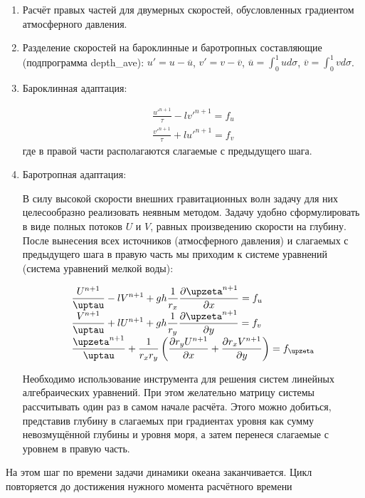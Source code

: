 \begin{enumerate}
\item Расчёт правых частей для двумерных скоростей, обусловленных градиентом атмосферного давления.

\item Разделение скоростей на бароклинные и баротропных составляющие (подпрограмма depth\_ave): $u' = u - \overline{u}$, $v' = v - \overline{v}$, $\overline{u} = \int_0^1 u d\sigma$, $\overline{v} = \int_0^1 v d\sigma$.

\item Бароклинная адаптация:

\begin{equation} \label{eq:inmsom/19} 
\begin{array}{l} 
\displaystyle{ \frac{u'^{n+1}}{\tau} - l v'^{n+1} = f_u } \\
\displaystyle{ \frac{v'^{n+1}}{\tau} + l u'^{n+1} = f_v }
\end{array} 
\end{equation} 
где в правой части располагаются слагаемые с предыдущего шага. 

\item Баротропная адаптация:

В силу высокой скорости внешних гравитационных волн задачу для них целесообразно реализовать неявным методом. 
Задачу удобно сформулировать в виде полных потоков $U$ и $V$, равных произведению скорости на глубину. 
После вынесения всех источников (атмосферного давления) и слагаемых с предыдущего шага в правую часть мы приходим к системе уравнений (система уравнений мелкой воды):

\begin{equation} \label{eq:inmsom/20} 
\begin{array}{l} 
\displaystyle{ \frac{U^{n+1}}{\tau} - l V^{n+1} + gh\frac{1}{r_x}\d{\zeta^{n+1}}{x} = f_u} \\
\displaystyle{ \frac{V^{n+1}}{\tau} + l U^{n+1} + gh\frac{1}{r_y}\d{\zeta^{n+1}}{y} = f_v} \\
\displaystyle{ \frac{\zeta^{n+1}}{\tau} + \frac{1}{r_x r_y} \left( \d{r_y U^{n+1}}{x} + \d{r_x V^{n+1}}{y} \right) = f_\zeta}
\end{array} 
\end{equation} 

Необходимо использование инструмента для решения систем линейных алгебраических уравнений. При этом желательно матрицу системы рассчитывать один раз в самом начале расчёта. Этого можно добиться, представив глубину в слагаемых при градиентах уровня как сумму невозмущённой глубины и уровня моря, а затем перенеся слагаемые с уровнем в правую часть.

\end{enumerate}

На этом шаг по времени задачи динамики океана заканчивается. Цикл повторяется до достижения нужного момента расчётного времени

\FloatBarrier